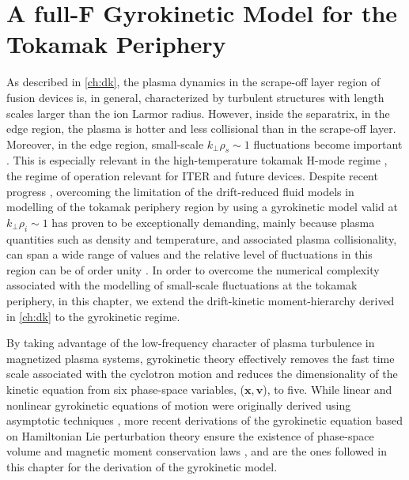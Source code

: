 \chapter{A full-F Gyrokinetic Model for the Tokamak Periphery}
\label{ch:gk}

As described in \cref{ch:dk}, the plasma dynamics in the scrape-off layer region of fusion devices is, in general, characterized by turbulent structures with length scales larger than the ion Larmor radius.
%
However, inside the separatrix, in the edge region, the plasma is hotter and less collisional than in the scrape-off layer.
%
Moreover, in the edge region, small-scale $k_\perp \rho_s \sim 1$ fluctuations become important \citep{Hahm2009}.
%
This is especially relevant in the high-temperature tokamak H-mode regime \citep{Zweben2007}, the regime of operation relevant for ITER and future devices.
%
Despite recent progress \citep{Chang2017,Shi2017}, overcoming the limitation of the drift-reduced fluid models in modelling of the tokamak periphery region by using a gyrokinetic model valid at $k_\perp \rho_i \sim 1$ has proven to be exceptionally demanding, mainly because plasma quantities such as density and temperature, and associated plasma collisionality, can span a wide range of values and the relative level of fluctuations in this region can be of order unity \citep{Scott2002}.
%
In order to overcome the numerical complexity associated with the modelling of small-scale fluctuations at the tokamak periphery, in this chapter, we extend the drift-kinetic moment-hierarchy derived in \cref{ch:dk} to the gyrokinetic regime.

By taking advantage of the low-frequency character of plasma turbulence in magnetized plasma systems, gyrokinetic theory effectively removes the fast time scale associated with the cyclotron motion and reduces the dimensionality of the kinetic equation from six phase-space variables, ($\mathbf x, \mathbf v$), to five.
%
While linear and nonlinear gyrokinetic equations of motion were originally derived using asymptotic techniques \citep{Taylor1968,Rutherford1968a,Catto1978a}, more recent derivations of the gyrokinetic equation based on Hamiltonian Lie perturbation theory \citep{Cary1981} ensure the existence of phase-space volume and magnetic moment conservation laws \citep{Hahm1988a,Brizard2007a,Hahm2009,Frei2019}, and are the ones followed in this chapter for the derivation of the gyrokinetic model.

